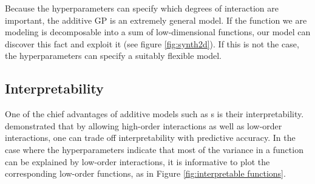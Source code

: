 
Because the hyperparameters can specify which degrees of interaction are important, the additive GP is an extremely general model.  
  If the function we are modeling is decomposable into a sum of low-dimensional functions, our model can discover this fact and exploit it (see figure \ref{fig:synth2d}).
If this is not the case, the hyperparameters can specify a suitably flexible model.





\subsection{Interpretability}
One of the chief advantages of additive models such as \GAM{}s is their interpretability.
\citet{plate1999accuracy} demonstrated that by allowing high-order interactions as well as low-order interactions, one can trade off interpretability with predictive accuracy.  In the case where the hyperparameters indicate that most of the variance in a function can be explained by low-order interactions, it is informative to plot the corresponding low-order functions, as in Figure \ref{fig:interpretable functions}. 


